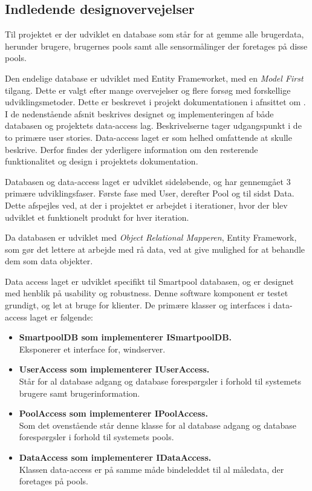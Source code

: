 \subsection{Indledende designovervejelser}\label{sec:designdatabase}

Til projektet er der udviklet en database som står for at gemme alle brugerdata, herunder brugere, brugernes pools samt alle sensormålinger der foretages på disse pools.

Den endelige database er udviklet med Entity Frameworket, med en \textit{Model First} tilgang. Dette er valgt efter mange overvejelser og flere forsøg med forskellige udviklingsmetoder. Dette er beskrevet i projekt dokumentationen i afnsittet om . I de nedenstående afsnit beskrives designet og implementeringen af både databasen og projektets data-access lag. Beskrivelserne tager udgangspunkt i de to primære user stories. Data-access laget er som helhed omfattende at skulle beskrive. Derfor findes der yderligere information om den resterende funktionalitet og design i projektets dokumentation.

Databasen og data-access laget er udviklet sideløbende, og har gennemgået 3 primære udviklingsfaser. Første fase med User, derefter Pool og til sidst Data. Dette afspejles ved, at der i projektet er arbejdet i iterationer, hvor der blev udviklet et funktionelt produkt for hver iteration.

Da databasen er udviklet med \textit{Object Relational Mapperen}, Entity Framework, som gør det lettere at arbejde med rå data, ved at give mulighed for at behandle dem som data objekter.

Data access laget er udviklet specifikt til Smartpool databasen, og er designet med henblik på usability og robustness. Denne software komponent er testet grundigt, og let at bruge for klienter. De primære klasser og interfaces i data-access laget er følgende:

\begin{itemize}
	\item \textbf{SmartpoolDB som implementerer ISmartpoolDB.}\\
	Eksponerer et interface for, \gls{windserver}.
	\item \textbf{UserAccess som implementerer IUserAccess.}\\
	Står for al database adgang og database forespørgsler i forhold til systemets brugere samt brugerinformation.
	\item \textbf{PoolAccess som implementerer IPoolAccess.}\\
	Som det ovenstående står denne klasse for al database adgang og database forespørgsler i forhold til systemets pools.
	\item \textbf{DataAccess som implementerer IDataAccess.}\\
	Klassen data-access er på samme måde bindeleddet til al måledata, der foretages på pools.
\end{itemize}

